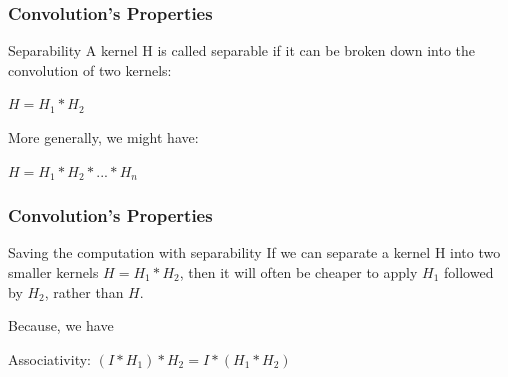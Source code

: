 \documentclass[english,11pt,table,handout]{beamer}
\begin{document}
\frame
{
	\frametitle{Convolution's Properties}
	\begin{block}{Separability}
		A kernel H is called separable if it can be broken down into the convolution of two kernels:
		
		\centering $H = H_{1} * H_{2}$
		
		\flushleft More generally, we might have:
		
		\centering $H = H_{1} * H_{2}* ... * H_{n}$
	\end{block}
}

\frame
{
	\frametitle{Convolution's Properties}
	\begin{block}{Saving the computation with separability}
		If we can separate a kernel H into two smaller kernels $H = H_{1} * H_{2}$, then it will often be cheaper to apply $H_{1}$ followed by $H_{2}$, rather than $H$.
	\end{block}
	Because, we have
	
	\begin{block}{Associativity:}
		\centering
		$(I * H_{1})*H_{2} =I * (H_{1}*H_{2})$
	\end{block}
}
\end{document}
